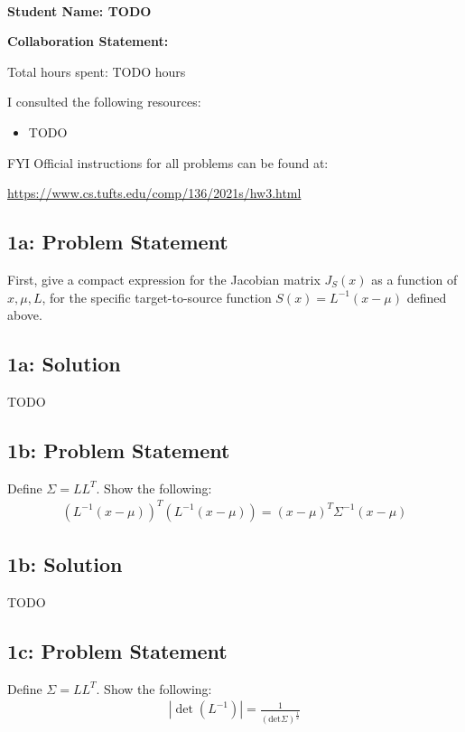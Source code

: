 \documentclass[10pt]{article}
\newcommand{\officialdirections}[1]{{\color{blue} #1}}
\begin{document}
~~\\ %
\Large{\bf Student Name: TODO}

\Large{\bf Collaboration Statement:}

Total hours spent: TODO hours

I consulted the following resources:
\begin{itemize}
\item TODO
\end{itemize}

FYI Official instructions for all problems can be found at:

\url{https://www.cs.tufts.edu/comp/136/2021s/hw3.html}

\tableofcontents


\newpage
\officialdirections{
\subsection*{1a: Problem Statement}
 First, give a compact expression for the Jacobian matrix $J_S(x)$ as a function of $x, \mu, L$, for the specific target-to-source function $S(x) = L^{-1} (x - \mu)$ defined above.
}

\subsection{1a: Solution}
TODO




\newpage
\officialdirections{
\subsection*{1b: Problem Statement}
Define $\Sigma = L L^T$. Show the following:
\begin{align}
( L^{-1} (x - \mu))^T ( L^{-1} (x - \mu)) = (x-\mu)^T \Sigma^{-1} (x-\mu)
\end{align}
}

\subsection{1b: Solution}
TODO


\newpage
\officialdirections{
\subsection*{1c: Problem Statement}
 Define $\Sigma = L L^T$. Show the following:
\begin{align}
| \det (L^{-1}) | = \frac{1}{(\text{det} \Sigma)^{\frac{1}{2}}}
\end{align}
}
\end{document}
